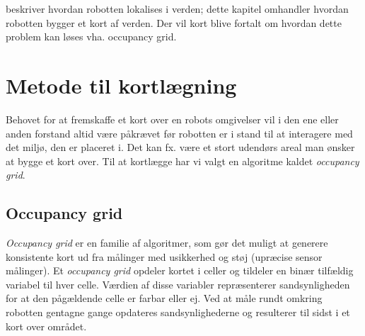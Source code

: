  beskriver hvordan robotten lokalises i verden; dette kapitel omhandler hvordan robotten bygger et kort af verden.
Der vil kort blive fortalt om hvordan dette problem kan løses vha. occupancy grid.

\section{Metode til kortlægning}
Behovet for at fremskaffe et kort over en robots omgivelser vil i den ene eller anden forstand altid være påkrævet før robotten er i stand til at interagere med det miljø, den er placeret i.
Det kan fx. være et stort udendørs areal man ønsker at bygge et kort over.
Til at kortlægge har vi valgt en algoritme kaldet \textit{occupancy grid}. 

\subsection{Occupancy grid}
\textit{Occupancy grid} er en familie af algoritmer, som gør det muligt at generere konsistente kort ud fra målinger med usikkerhed og støj (upræcise sensor målinger).
Et \textit{occupancy grid} opdeler kortet i celler og tildeler en binær tilfældig variabel til hver celle.
Værdien af disse variabler repræsenterer sandsynligheden for at den pågældende celle er farbar eller ej.
Ved at måle rundt omkring robotten gentagne gange opdateres sandsynlighederne og resulterer til sidst i et kort over området.